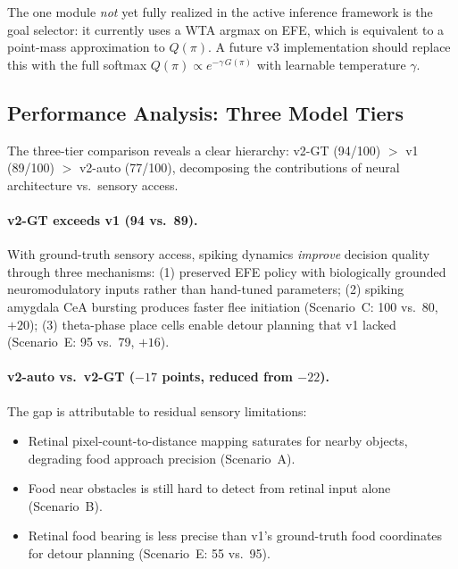 \documentclass[11pt,a4paper]{article}
\begin{document}
The one module \emph{not} yet fully realized in the active inference
framework is the goal selector: it currently uses a WTA argmax on EFE,
which is equivalent to a point-mass approximation to $Q(\pi)$.
A future v3 implementation should replace this with the full softmax
$Q(\pi) \propto e^{-\gamma\,G(\pi)}$ with learnable temperature $\gamma$.

\subsection{Performance Analysis: Three Model Tiers}\label{sec:why_89}

The three-tier comparison reveals a clear hierarchy: v2-GT (94/100)
$>$ v1 (89/100) $>$ v2-auto (77/100), decomposing the contributions
of neural architecture vs.\ sensory access.

\paragraph{v2-GT exceeds v1 (94 vs.\ 89).}
With ground-truth sensory access, spiking dynamics \emph{improve}
decision quality through three mechanisms:
(1) preserved EFE policy with biologically grounded neuromodulatory
inputs rather than hand-tuned parameters;
(2) spiking amygdala CeA bursting produces faster flee initiation
(Scenario~C: 100 vs.\ 80, $+20$);
(3) theta-phase place cells enable detour planning that v1 lacked
(Scenario~E: 95 vs.\ 79, $+16$).

\paragraph{v2-auto vs.\ v2-GT ($-17$ points, reduced from $-22$).}
The gap is attributable to residual sensory limitations:
\begin{itemize}[nosep]
  \item Retinal pixel-count-to-distance mapping saturates for
    nearby objects, degrading food approach precision (Scenario~A).
  \item Food near obstacles is still hard to detect from retinal
    input alone (Scenario~B).
  \item Retinal food bearing is less precise than v1's ground-truth
    food coordinates for detour planning (Scenario~E: 55 vs.\ 95).
\end{itemize}
\end{document}
